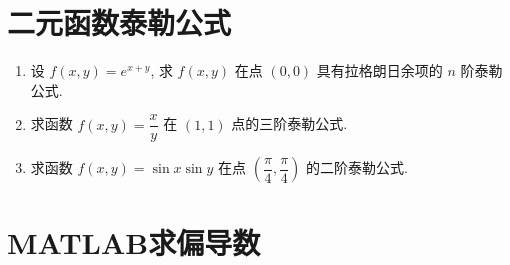 \section{二元函数泰勒公式}

\begin{enumerate}\setlength{\itemsep}{7pt}
    \item 设 $f(x, y)=e^{x+y}$, 求 $f(x, y)$ 在点 $(0, 0)$ 具有拉格朗日余项的 $n$ 阶泰勒公式.
    
    \item 求函数 $f(x, y)=\dfrac{x}{y}$ 在 $(1, 1)$ 点的三阶泰勒公式.
    
    \item 求函数 $f(x, y)=\sin x\sin y$ 在点 $\left(\dfrac{\pi}{4}, \dfrac{\pi}{4}\right)$ 的二阶泰勒公式.
\end{enumerate}

\section{MATLAB求偏导数}